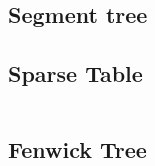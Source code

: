 \subsection{Segment tree}
    
\subsection{Sparse Table}
	\inputminted{cpp}{Estructuras/sparseTable.cpp}
\subsection{Fenwick Tree}
